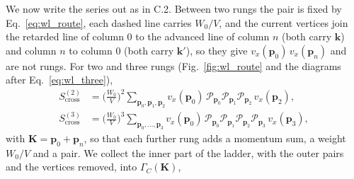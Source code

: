 We now write the series out as in C.2. Between two rungs the pair is fixed by Eq.~\eqref{eq:wl_route}, each dashed line carries $W_0/V$, and the current vertices join the retarded line of column $0$ to the advanced line of column $n$ (both carry $\mathbf k$) and column $n$ to column $0$ (both carry $\mathbf k'$), so they give $v_x(\mathbf p_0)\,v_x(\mathbf p_n)$ and are not rungs. For two and three rungs (Fig.~\ref{fig:wl_route} and the diagrams after Eq.~\eqref{eq:wl_three}),
\[
\begin{aligned}
S^{(2)}_{\mathrm{cross}}&=\Big(\frac{W_0}{V}\Big)^{2}\sum_{\mathbf p_0,\mathbf p_1,\mathbf p_2}
v_x(\mathbf p_0)\,\mathcal P_{\mathbf p_0}\mathcal P_{\mathbf p_1}\mathcal P_{\mathbf p_2}\,v_x(\mathbf p_2),\\
S^{(3)}_{\mathrm{cross}}&=\Big(\frac{W_0}{V}\Big)^{3}\sum_{\mathbf p_0,\dots,\mathbf p_3}
v_x(\mathbf p_0)\,\mathcal P_{\mathbf p_0}\mathcal P_{\mathbf p_1}\mathcal P_{\mathbf p_2}\mathcal P_{\mathbf p_3}\,v_x(\mathbf p_3),
\end{aligned}
\]
with $\mathbf K=\mathbf p_0+\mathbf p_n$, so that each further rung adds a momentum sum, a weight $W_0/V$ and a pair. We collect the inner part of the ladder, with the outer pairs and the vertices removed, into $\Gamma_C(\mathbf K)$,
\begin{center}
\end{center}
